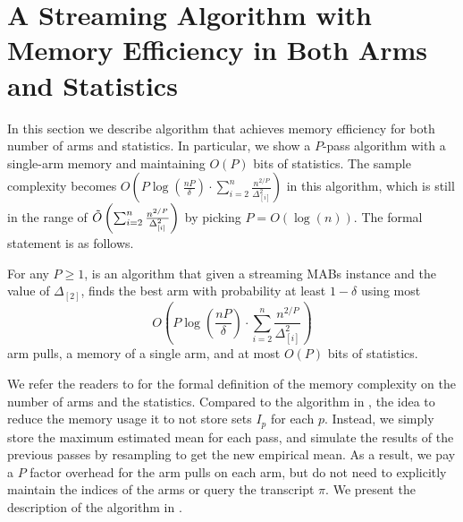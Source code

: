 \section{A Streaming Algorithm with Memory Efficiency in Both Arms and Statistics}\label{sec:ub-stat-efficient}
In this section we describe algorithm that achieves memory efficiency for both number of arms and statistics. In particular, we show a $P$-pass algorithm with a single-arm memory and maintaining \(O(P)\) bits of statistics. The sample complexity becomes \(O\left(P \log \left(\frac{nP}{\delta}\right) \cdot \sum_{i = 2}^{n} \frac{n^{2/P}}{\Delta^2_{[i]}}\right)\) in this algorithm, which is still in the range of $\tilde{O}\left(\sum_{i = 2}^{n} \frac{n^{2/P}}{\Delta^2_{[i]}}\right)$ by picking $P=O(\log(n))$. The formal statement is as follows.

\begin{theorem}
	\label{thm:improved}
	For any \(P \geq 1\),  is an algorithm that given a streaming MABs instance and the value of $\Delta_{[2]}$, finds the best arm with probability at least \(1-\delta\) using most
	\[O\left(P \log \left(\frac{nP}{\delta}\right) \cdot \sum_{i = 2}^{n} \frac{n^{2/P}}{\Delta^2_{[i]}}\right)\] 
	arm pulls, a memory of a single arm, and at most $O(P)$ bits of statistics.
\end{theorem}

We refer the readers to  for the formal definition of the memory complexity on the number of arms and the statistics. Compared to the algorithm in , the idea to reduce the memory usage it to not store sets \(I_p\) for each \(p\). Instead, we simply store the maximum estimated mean for each pass, and simulate the results of the previous passes by resampling to get the new empirical mean. As a result, we pay a $P$ factor overhead for the arm pulls on each arm, but do not need to explicitly maintain the indices of the arms or query the transcript $\pi$. We present the description of the algorithm in . 


